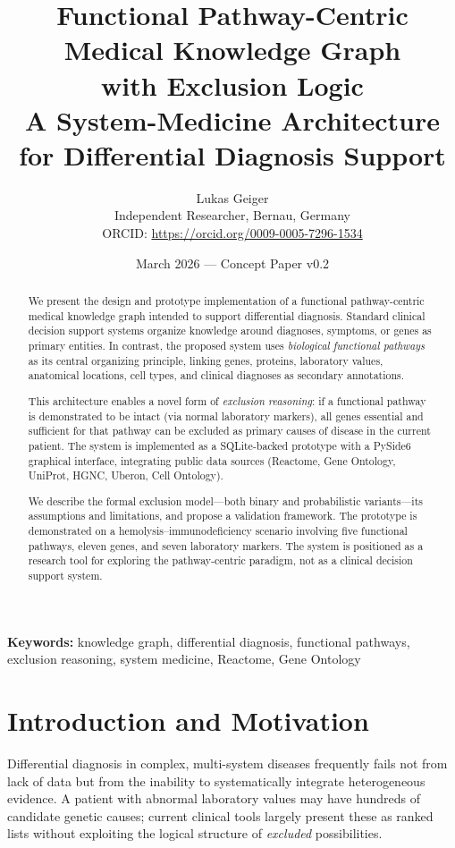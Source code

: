 \documentclass[12pt,a4paper]{article}
\title{%
    \textbf{Functional Pathway-Centric Medical Knowledge Graph\\
    with Exclusion Logic}\\[0.5em]
    \large A System-Medicine Architecture for Differential Diagnosis Support
}
\author{
    Lukas Geiger\\
    Independent Researcher, Bernau, Germany\\
    ORCID: \url{https://orcid.org/0009-0005-7296-1534}
}
\date{March 2026 --- Concept Paper v0.2}
\begin{document}
\maketitle

\begin{abstract}
We present the design and prototype implementation of a functional pathway-centric medical knowledge graph intended to support differential diagnosis. Standard clinical decision support systems organize knowledge around diagnoses, symptoms, or genes as primary entities. In contrast, the proposed system uses \emph{biological functional pathways} as its central organizing principle, linking genes, proteins, laboratory values, anatomical locations, cell types, and clinical diagnoses as secondary annotations.

This architecture enables a novel form of \emph{exclusion reasoning}: if a functional pathway is demonstrated to be intact (via normal laboratory markers), all genes essential and sufficient for that pathway can be excluded as primary causes of disease in the current patient. The system is implemented as a SQLite-backed prototype with a PySide6 graphical interface, integrating public data sources (Reactome, Gene Ontology, UniProt, HGNC, Uberon, Cell Ontology).

We describe the formal exclusion model---both binary and probabilistic variants---its assumptions and limitations, and propose a validation framework. The prototype is demonstrated on a hemolysis--immunodeficiency scenario involving five functional pathways, eleven genes, and seven laboratory markers. The system is positioned as a research tool for exploring the pathway-centric paradigm, not as a clinical decision support system.
\end{abstract}

\smallskip
\noindent\textbf{Keywords:} knowledge graph, differential diagnosis, functional pathways, exclusion reasoning, system medicine, Reactome, Gene Ontology

\section{Introduction and Motivation}
\label{sec:introduction}

Differential diagnosis in complex, multi-system diseases frequently fails not from lack of data but from the inability to systematically integrate heterogeneous evidence. A patient with abnormal laboratory values may have hundreds of candidate genetic causes; current clinical tools largely present these as ranked lists without exploiting the logical structure of \emph{excluded} possibilities.
\end{document}
